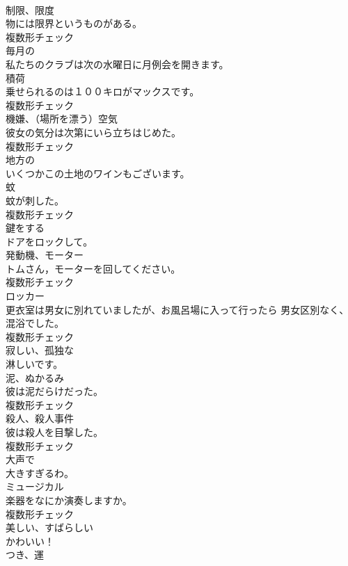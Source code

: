 \documentclass[8pt]{extreport}
\begin{document}
\begin{CJK}{UTF8}{min}
\\	[名詞]	制限、限度	
\\	物には限界というものがある。	
\\	複数形チェック
\\	[形容詞]	毎月の	
\\	私たちのクラブは次の水曜日に月例会を開きます。	
\\	[名詞]	積荷	
\\	乗せられるのは１００キロがマックスです。	
\\	複数形チェック
\\	[名詞]	機嫌、（場所を漂う）空気	
\\	彼女の気分は次第にいら立ちはじめた。	
\\	複数形チェック
\\	[形容詞]	地方の	
\\	いくつかこの土地のワインもございます。	
\\	[名詞]	蚊	
\\	蚊が刺した。	
\\	複数形チェック
\\	[動詞]	鍵をする	
\\	ドアをロックして。	
\\	[名詞]	発動機、モーター	
\\	トムさん，モーターを回してください。	
\\	複数形チェック
\\	[名詞]	ロッカー	
\\	更衣室は男女に別れていましたが、お風呂場に入って行ったら 男女区別なく、混浴でした。	
\\	複数形チェック
\\	[形容詞]	寂しい、孤独な	
\\	淋しいです。	
\\	[名詞]	泥、ぬかるみ	
\\	彼は泥だらけだった。	
\\	複数形チェック
\\	[名詞]	殺人、殺人事件	
\\	彼は殺人を目撃した。	
\\	複数形チェック
\\	[形容詞]	大声で	
\\	大きすぎるわ。	
\\	[名詞]	ミュージカル	
\\	楽器をなにか演奏しますか。	
\\	複数形チェック
\\	[形容詞]	美しい、すばらしい	
\\	かわいい！	
\\	[名詞]	つき、運	

\end{CJK}
\end{document}
